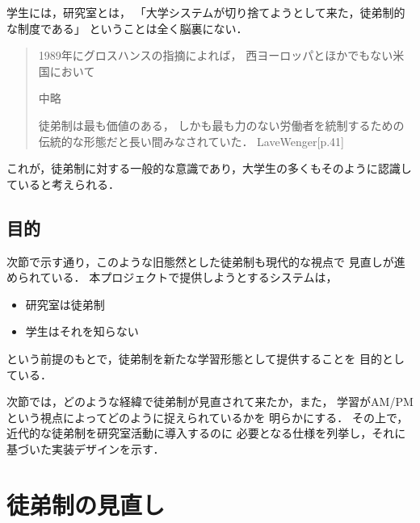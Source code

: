 \documentclass[a4,p11]{article}
\begin{document}
学生には，研究室とは，
「大学システムが切り捨てようとして来た，徒弟制的な制度である」
ということは全く脳裏にない．
\begin{quote}
1989年にグロスハンスの指摘によれば，
西ヨーロッパとほかでもない米国において

中略

徒弟制は最も価値のある，
しかも最も力のない労働者を統制するための伝統的な形態だと長い間みなされていた．
LaveWenger[p.41]
\end{quote}
これが，徒弟制に対する一般的な意識であり，大学生の多くもそのように認識していると考えられる．

\subsection{目的}
\label{sec:org0c6a7ac}
次節で示す通り，このような旧態然とした徒弟制も現代的な視点で
見直しが進められている．
本プロジェクトで提供しようとするシステムは，
\begin{itemize}
\item 研究室は徒弟制
\item 学生はそれを知らない
\end{itemize}
という前提のもとで，徒弟制を新たな学習形態として提供することを
目的としている．

次節では，どのような経緯で徒弟制が見直されて来たか，また，
学習がAM/PMという視点によってどのように捉えられているかを
明らかにする．
その上で，近代的な徒弟制を研究室活動に導入するのに
必要となる仕様を列挙し，それに基づいた実装デザインを示す．

\section{徒弟制の見直し}
\label{sec:org516a40d}
\end{document}
